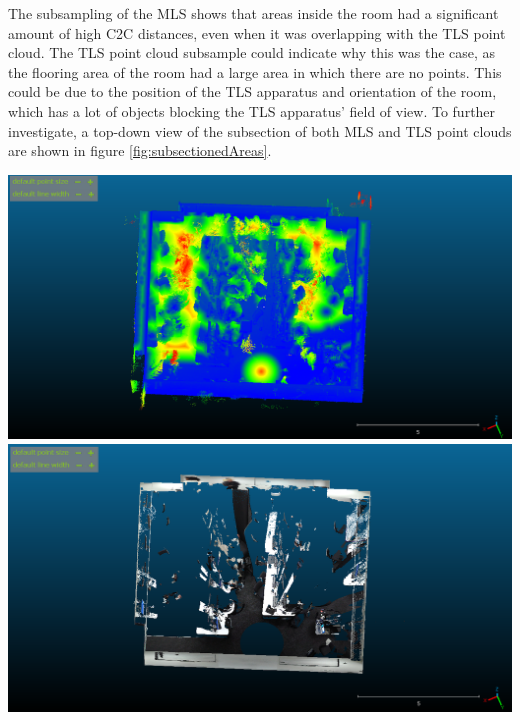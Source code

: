 \documentclass[man]{apa7}
\begin{document}
The subsampling of the MLS shows that areas inside the room had a significant amount of high C2C distances, even when it was overlapping with the TLS point cloud. The TLS point cloud subsample could indicate why this was the case, as the flooring area of the room had a large area in which there are no points. This could be due to the position of the TLS apparatus and orientation of the room, which has a lot of objects blocking the TLS apparatus' field of view. To further investigate, a top-down view of the subsection of both MLS and TLS point clouds are shown in figure \ref{fig:subsectionedAreas}.

\begin{minipage}{\linewidth}
  \includegraphics[height=\textheight/4 ,width=\textwidth/2]{figures/subsectionedMLS.png}
  \includegraphics[height=\textheight/4 ,width=\textwidth/2]{figures/subsectionedTLS.png}
  \label{fig:subsectionedAreas}
\end{minipage}
\end{document}
